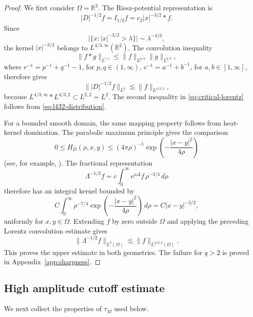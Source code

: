 \documentclass[11pt,reqno]{amsproc}
\newcommand{\dd}{\,d}
\begin{document}
\begin{proof}
We first consider $\Omega=\mathbb R^2$.  The Riesz-potential representation is
\[
 |D|^{-1/2}f=I_{1/2}f=c_2|x|^{-3/2}*f.
\]
Since
\[
 \bigl|\{x:|x|^{-3/2}>\lambda\}\bigr|\sim\lambda^{-4/3},
\]
the kernel $|x|^{-3/2}$ belongs to $L^{4/3,\infty}(\mathbb R^2)$.
The convolution inequality \cite{ONeil1963}
\[
\|f*g\|_{L^{r,c}} \le \|f\|_{L^{p, a}}\|g\|_{L^{q,b}},
\]
where $r^{-1} = p^{-1}+ q^{-1} - 1$, for $p,q\in (1,\infty)$,  $c^{-1} = a^{-1}+ b^{-1}$, for $a,b\in [1,\infty]$,
therefore gives 
\[
 \bigl\||D|^{-1/2}f\bigr\|_{L^2}
 \lesssim\|f\|_{L^{4/3,2}},
\]
because $L^{4/3,\infty}*L^{4/3,2}\subset L^{2,2}=L^2$.  The second
inequality in \eqref{eq:critical-lorentz} follows from
\eqref{eq:l432-distribution}.
	
For a bounded smooth domain, the same mapping property follows from heat-kernel
domination.  The parabolic maximum principle gives the comparison
\[
  0\leq H_D(\rho,x,y)
  \leq(4\pi\rho)^{-1}
  \exp\left(-\frac{|x-y|^2}{4\rho}\right)
\]
(see, for example,
\cite{ConstantinIgnatova2017,ConstantinNguyen2018}).  The fractional
representation
\[
  \Lambda^{-1/2}f
  =c\int_0^\infty e^{\rho\Delta}f\,\rho^{-3/4}\dd\rho
\]
therefore has an integral kernel bounded by
\[
 C\int_0^\infty \rho^{-7/4}
 \exp\left(-\frac{|x-y|^2}{4\rho}\right)\dd\rho
 =C|x-y|^{-3/2},
\]
uniformly for $x,y\in\Omega$.  Extending $f$ by zero outside $\Omega$ and applying the
preceding Lorentz convolution estimate gives
\[
  \|\Lambda^{-1/2}f\|_{L^2(\Omega)}
  \lesssim \|f\|_{L^{4/3,2}(\Omega)}.
\]
This proves the upper estimate in both geometries.  The failure for $q>2$ is
proved in Appendix~\ref{app:sharpness}.
\end{proof}

\subsection{High amplitude cutoff  estimate}\label{subsec:tail-estimate}

We next collect the properties of $\tau_M$ used below.
\end{document}
